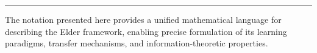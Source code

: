 \begin{center}
\vspace{0.5cm}
\rule{0.5\textwidth}{0.5pt}
\end{center}

\vspace{0.5cm}
\noindent The notation presented here provides a unified mathematical language for describing the Elder framework, enabling precise formulation of its learning paradigms, transfer mechanisms, and information-theoretic properties.